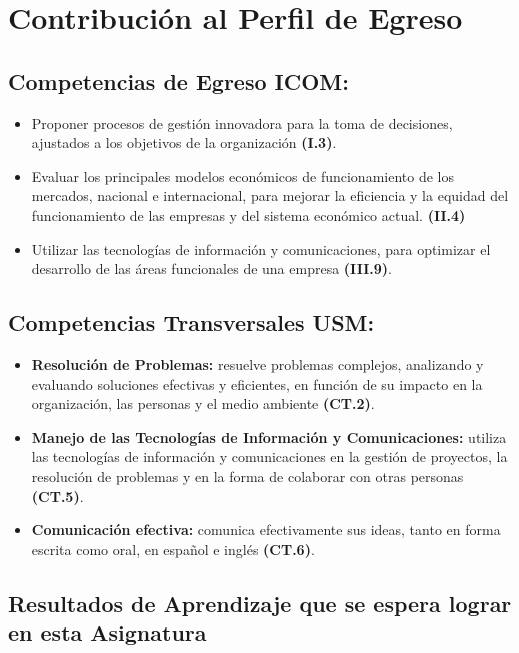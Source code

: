 \documentclass[10pt,a4paper]{article}
\begin{document}
\section*{Contribución al Perfil de Egreso}

\subsection*{Competencias de Egreso ICOM:}
\begin{itemize}
    \item Proponer procesos de gestión innovadora para la toma de decisiones, ajustados a los objetivos de la organización {\bf (I.3)}. 
    \item Evaluar los principales modelos económicos de funcionamiento de los mercados, nacional e internacional, para mejorar la eficiencia y la equidad del funcionamiento de las empresas y del sistema económico actual.  {\bf (II.4)}
    \item Utilizar las tecnologías de información y comunicaciones, para optimizar el desarrollo de las áreas funcionales de una empresa  {\bf (III.9)}.
\end{itemize}

\subsection*{Competencias Transversales USM:}
\begin{itemize}
    \item \textbf{Resolución de Problemas:} resuelve problemas complejos, analizando y evaluando soluciones efectivas y eficientes, en función de su impacto en la organización, las personas y el medio ambiente  {\bf (CT.2)}.
    \item \textbf{Manejo de las Tecnologías de Información y Comunicaciones:} utiliza las tecnologías de información y comunicaciones en la gestión de proyectos, la resolución de problemas y en la forma de colaborar con otras personas  {\bf (CT.5)}.
    \item \textbf{Comunicación efectiva:} comunica efectivamente sus ideas, tanto en forma escrita como oral, en español e inglés  {\bf (CT.6)}.
\end{itemize}

\subsection*{Resultados de Aprendizaje que se espera lograr en esta Asignatura}
\end{document}
